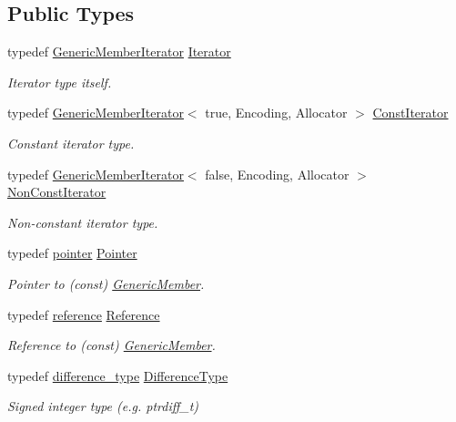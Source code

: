 \subsection*{Public Types}
\begin{DoxyCompactItemize}
\item 
typedef \hyperlink{classGenericMemberIterator}{Generic\+Member\+Iterator} \hyperlink{classGenericMemberIterator_ad1cf1ecf6210b47906c9f179c893a8b8}{Iterator}
\begin{DoxyCompactList}\small\item\em Iterator type itself. \end{DoxyCompactList}\item 
typedef \hyperlink{classGenericMemberIterator}{Generic\+Member\+Iterator}$<$ true, Encoding, Allocator $>$ \hyperlink{classGenericMemberIterator_ae5be27a73dce0be58ee2776db896d591}{Const\+Iterator}
\begin{DoxyCompactList}\small\item\em Constant iterator type. \end{DoxyCompactList}\item 
typedef \hyperlink{classGenericMemberIterator}{Generic\+Member\+Iterator}$<$ false, Encoding, Allocator $>$ \hyperlink{classGenericMemberIterator_abc26eb06f2962765b11dcd06ce84ac02}{Non\+Const\+Iterator}
\begin{DoxyCompactList}\small\item\em Non-\/constant iterator type. \end{DoxyCompactList}\item 
typedef \hyperlink{classGenericMemberIterator_a7c3623bc81b06495fd3128398487e99e}{pointer} \hyperlink{classGenericMemberIterator_ac0bd6e77617593892fc13afb00e62f29}{Pointer}
\begin{DoxyCompactList}\small\item\em Pointer to (const) \hyperlink{classGenericMember}{Generic\+Member}. \end{DoxyCompactList}\item 
typedef \hyperlink{classGenericMemberIterator_a182876d698903331bd0b11db6d1beeca}{reference} \hyperlink{classGenericMemberIterator_a8042a85a9e233d65de5b6c66d9a1109a}{Reference}
\begin{DoxyCompactList}\small\item\em Reference to (const) \hyperlink{classGenericMember}{Generic\+Member}. \end{DoxyCompactList}\item 
typedef \hyperlink{classGenericMemberIterator_ae60bbcbaec51d36eef299996543872e6}{difference\+\_\+type} \hyperlink{classGenericMemberIterator_aaa13c83e6e0d1f5b413d62cacd8f6a2e}{Difference\+Type}
\begin{DoxyCompactList}\small\item\em Signed integer type (e.\+g. {\ttfamily ptrdiff\+\_\+t}) \end{DoxyCompactList}\end{DoxyCompactItemize}
